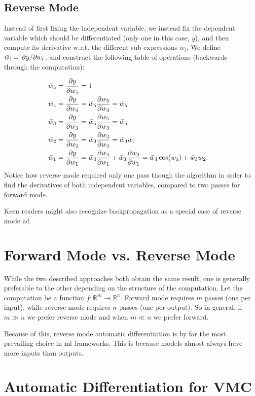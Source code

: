 \documentclass[Thesis.tex]{subfiles}
\begin{document}
\subsection{Reverse Mode}

Instead of first fixing the independent variable, we instead fix the dependent
variable which should be differentiated (only one in this case, \(y\)), and then
compute its derivative w.r.t. the different sub expressions $w_i$. We define
\(\bar w_i = \pdv*{y}{w_i}\), and construct the following table of operations
(backwards through the computation):

\begin{align*}
  \bar w_5 &= \pdv{y}{w_5} = 1\\
  \bar w_4 &= \pdv{y}{w_4} = \bar w_5\pdv{w_5}{w_4} = \bar w_5\\
  \bar w_3 &= \pdv{y}{w_3} = \bar w_5\pdv{w_5}{w_3} = \bar w_5\\
  \bar w_2 &= \pdv{y}{w_2} = \bar w_3\pdv{w_3}{w_2} = \bar w_3 w_1\\
  \bar w_1 &= \pdv{y}{w_1} = \bar w_4\pdv{w_4}{w_1} + \bar w_3 \pdv{w_3}{w_1}= \bar w_4 \cos(w_1) + \bar w_3w_2.
\end{align*}
Notice how reverse mode required only one pass though the algorithm in order to
find the derivatives of both independent variables, compared to two passes for
forward mode.

Keen readers might also recognize backpropagation as a special case of reverse mode \gls{ad}.

\section{Forward Mode vs. Reverse Mode}

While the two described approaches both obtain the same result, one is generally
preferable to the other depending on the structure of the computation. Let the
computation be a function $f: \mathbb{R}^{m}\to\mathbb{R}^n$. Forward mode
requires $m$ passes (one per input), while reverse mode requires $n$ passes (one
per output). So in general, if $m \gg n$ we prefer reverse mode and when $m\ll
n$ we prefer forward.

Because of this, reverse mode automatic differentiation is by far the most
prevailing choice in \gls{ml} frameworks. This is because models almost always have
more inputs than outputs.

\section{Automatic Differentiation for VMC}
\end{document}
